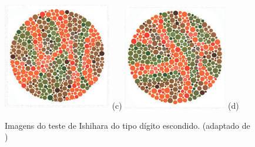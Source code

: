 \documentclass[	12pt, Times, openright, twoside, a4paper, english, brazil]{abntex2}
\begin{document}
\begin{apendicesenv}
\begin{figure}[!htb]
\centering
{\includegraphics[width=\linewidth]{ishihara-digitoescondido/figureIshihara20.png}}
(c)
\endminipage\hfill
{}
\centering
{\includegraphics[width=\linewidth]{ishihara-digitoescondido/figureIshihara21.png}}
(d)
\endminipage\hfill
\caption{Imagens do teste de Ishihara do tipo dígito escondido. (adaptado de )}
\label{fig:apendiceDigitoEscondido}
\end{figure}


\end{apendicesenv}
\end{document}
